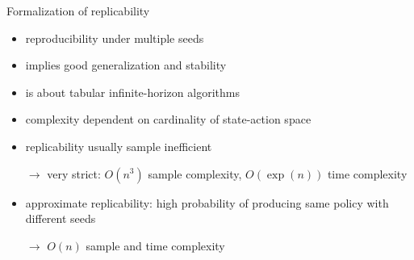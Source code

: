 \documentclass[12pt]{beamer}
\begin{document}
\begin{frame}{Formalization of replicability}
  \begin{itemize}
    \item reproducibility under multiple seeds
    \item implies good generalization and stability \parencite{reproducibility_learning}
    \item \parencite{replicability} is about tabular infinite-horizon algorithms
    \item complexity dependent on cardinality of state-action space
    \item replicability usually sample inefficient \parencite{replicability}
    \item[$\rightarrow$] very strict: $O(n^3)$ sample complexity, $O(\exp(n))$ time complexity
    \item approximate replicability: high probability of producing same policy with different seeds
    \item[$\rightarrow$] $O(n)$ sample and time complexity \parencite{replicability}
  \end{itemize}
\end{frame}
\end{document}
